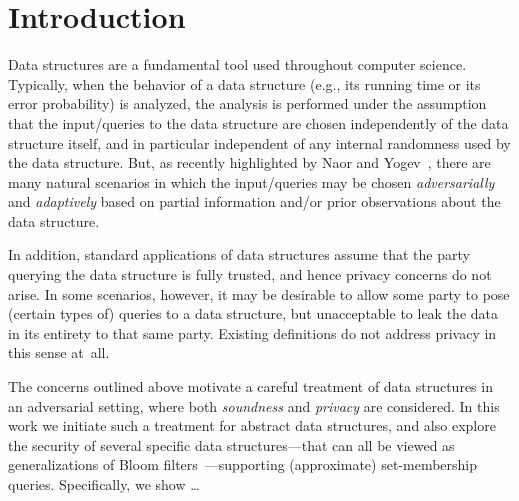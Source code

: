 \section{Introduction}
\label{sec:intro}

Data structures are a fundamental tool used throughout computer
science. Typically, when the behavior of a data structure (e.g., its
running time or its error probability) is analyzed, the analysis is
performed under the assumption that the input/queries to the data
structure are chosen independently of the data structure itself, and
in particular independent of any internal randomness used by the
data structure. But, as recently highlighted by Naor and
Yogev~\cite{naor2015bloom}, there are many natural scenarios in
which the input/queries may be chosen \emph{adversarially} and
\emph{adaptively} based on partial information and/or prior
observations about the data structure.

In addition, standard applications of data structures assume that
the party querying the data structure is fully trusted, and hence
privacy concerns do not arise. In some scenarios, however, it may be
desirable to allow some party to pose (certain types of) queries to
a data structure, but unacceptable to leak the data in its entirety
to that same party. Existing definitions do not address privacy in
this sense at~all.

The concerns outlined above motivate a careful treatment of data
structures in an adversarial setting, where both \emph{soundness}
and \emph{privacy} are considered. In this work we initiate such a
treatment for abstract data structures, and also explore the
security of several specific data structures---that can all be
viewed as generalizations of Bloom
filters~\cite{bloom1970space}---supporting (approximate)
set-membership queries. Specifically, we show \ldots {}

